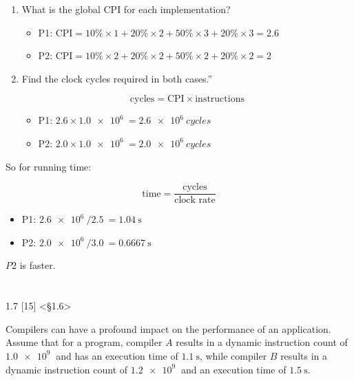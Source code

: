 \documentclass[paper=a4, fontsize=11pt]{scrartcl} %
\begin{document}
\begin{enumerate}
\item
  \begin{fancyquotes}
    What is the global CPI for each implementation?
  \end{fancyquotes}

  \begin{itemize}
  \item{P1:} $\text{CPI} = 10\%\times 1 + 20\%\times 2 + 50\%\times 3
    + 20\%\times 3 = 2.6$
  \item{P2:} $\text{CPI} = 10\%\times 2 + 20\%\times 2 + 50\%\times 2
    + 20\%\times 2 = 2$
  \end{itemize}

\item
  \begin{fancyquotes}
    Find the clock cycles required in both cases.”
  \end{fancyquotes}

  $$\text{cycles} = \text{CPI}\times\text{instructions}$$

  \begin{itemize}
  \item{P1:} $2.6\times\SI{1.0e6}{} = \SI{2.6e6}{cycles}$
  \item{P2:} $2.0\times\SI{1.0e6}{} = \SI{2.0e6}{cycles}$
  \end{itemize}
\end{enumerate}

So for running time:

$$\text{time} = \frac{\text{cycles}}{\text{clock rate}}$$

\begin{itemize}
\item{P1:} $\SI{2.6e6}{} / \SI{2.5}{} = \SI{1.04}{\second}$
\item{P2:} $\SI{2.0e6}{} / \SI{3.0}{} = \SI{0.6667}{\second}$
\end{itemize}

$P2$ is faster.

\pagebreak

\section{}

\begin{fancyquotes}
  1.7 [15] <§1.6>

  Compilers can have a profound impact on the performance of an
  application. Assume that for a program, compiler $A$ results in a
  dynamic instruction count of $\SI{1.0e9}{}$ and has an execution
  time of $\SI{1.1}{\second}$, while compiler $B$ results in a dynamic
  instruction count of $\SI{1.2e9}{}$ and an execution time of
  $\SI{1.5}{\second}$.
\end{fancyquotes}
\end{document}
